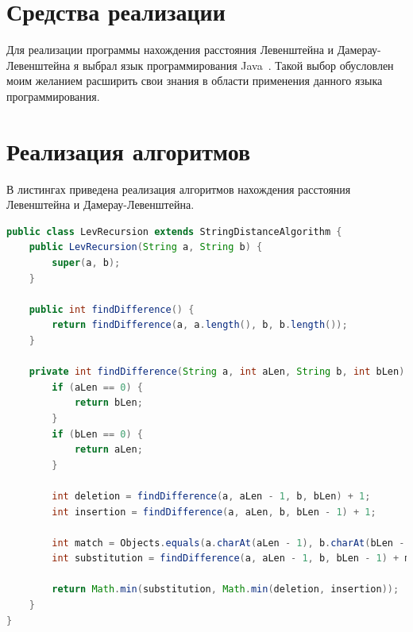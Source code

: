 \documentclass[12pt]{report}
\begin{document}
    \section{Средства реализации}
    Для реализации программы нахождения расстояния Левенштейна и Дамерау-Левенштейна
    я выбрал язык программирования Java~\cite{java}. Такой выбор обусловлен моим желанием
    расширить свои знания в области применения данного языка программирования.


    \section{Реализация алгоритмов}
    В листингах приведена реализация алгоритмов нахождения расстояния Левенштейна и Дамерау-Левенштейна.

    \begin{lstlisting}[label={lst:levrecur},caption=Метод для нахождения расстояния Левенштейна рекурсивно,
        language=java]
public class LevRecursion extends StringDistanceAlgorithm {
    public LevRecursion(String a, String b) {
        super(a, b);
    }

    public int findDifference() {
        return findDifference(a, a.length(), b, b.length());
    }

    private int findDifference(String a, int aLen, String b, int bLen) {
        if (aLen == 0) {
            return bLen;
        }
        if (bLen == 0) {
            return aLen;
        }

        int deletion = findDifference(a, aLen - 1, b, bLen) + 1;
        int insertion = findDifference(a, aLen, b, bLen - 1) + 1;

        int match = Objects.equals(a.charAt(aLen - 1), b.charAt(bLen - 1)) ? 0 : 1;
        int substitution = findDifference(a, aLen - 1, b, bLen - 1) + match;

        return Math.min(substitution, Math.min(deletion, insertion));
    }
}
    \end{lstlisting}
\end{document}
